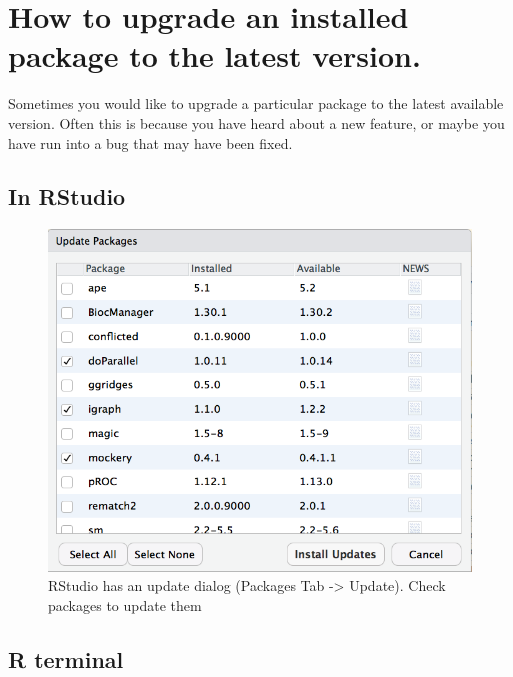 \documentclass[
  letterpaper,
]{book}
\begin{document}
\hypertarget{how-to-upgrade-an-installed-package-to-the-latest-version.}{%
\section{How to upgrade an installed package to the latest
version.}\label{how-to-upgrade-an-installed-package-to-the-latest-version.}}

Sometimes you would like to upgrade a particular package to the latest
available version. Often this is because you have heard about a new
feature, or maybe you have run into a bug that may have been fixed.

\hypertarget{in-rstudio}{%
\subsection{In RStudio}\label{in-rstudio}}

\begin{figure}

{\centering \includegraphics{./images/rstudio-update.png}

}

\caption{RStudio has an update dialog (Packages Tab -\textgreater{}
Update). Check packages to update them}

\end{figure}

\hypertarget{r-terminal}{%
\subsection{R terminal}\label{r-terminal}}
\end{document}
